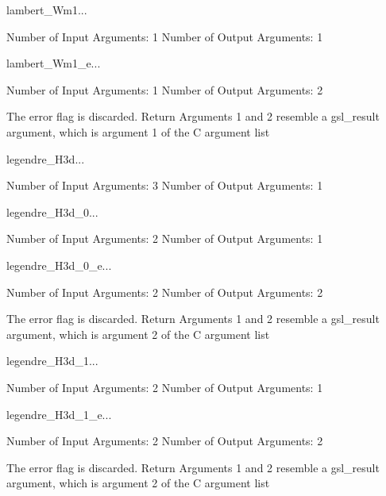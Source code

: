 \begin{funcdesc}{lambert_Wm1}{...}

    Number of Input  Arguments:  1
    Number of Output Arguments:  1
\end{funcdesc}

\begin{funcdesc}{lambert_Wm1_e}{...}

    Number of Input  Arguments:  1
    Number of Output Arguments:  2

The error flag is discarded.
Return Arguments 1 and 2 resemble a gsl_result argument,
	which is  argument 1 of the C argument list

\end{funcdesc}

\begin{funcdesc}{legendre_H3d}{...}

    Number of Input  Arguments:  3
    Number of Output Arguments:  1
\end{funcdesc}

\begin{funcdesc}{legendre_H3d_0}{...}

    Number of Input  Arguments:  2
    Number of Output Arguments:  1
\end{funcdesc}

\begin{funcdesc}{legendre_H3d_0_e}{...}

    Number of Input  Arguments:  2
    Number of Output Arguments:  2

The error flag is discarded.
Return Arguments 1 and 2 resemble a gsl_result argument,
	which is  argument 2 of the C argument list

\end{funcdesc}

\begin{funcdesc}{legendre_H3d_1}{...}

    Number of Input  Arguments:  2
    Number of Output Arguments:  1
\end{funcdesc}

\begin{funcdesc}{legendre_H3d_1_e}{...}

    Number of Input  Arguments:  2
    Number of Output Arguments:  2

The error flag is discarded.
Return Arguments 1 and 2 resemble a gsl_result argument,
	which is  argument 2 of the C argument list

\end{funcdesc}

